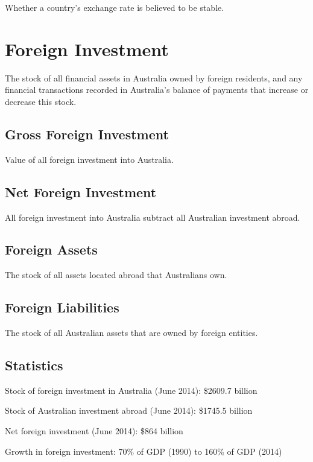 \documentclass[a4paper,11pt]{article}
\begin{document}
Whether a country's exchange rate is believed to be stable.




\section{Foreign Investment}

The stock of all financial assets in Australia owned by foreign residents, and
any financial transactions recorded in Australia's balance of payments that
increase or decrease this stock.


\subsection{Gross Foreign Investment}

Value of all foreign investment into Australia.


\subsection{Net Foreign Investment}

All foreign investment into Australia subtract all Australian investment
abroad.


\subsection{Foreign Assets}

The stock of all assets located abroad that Australians own.


\subsection{Foreign Liabilities}

The stock of all Australian assets that are owned by foreign entities.


\subsection{Statistics}

Stock of foreign investment in Australia (June 2014): \$2609.7 billion

Stock of Australian investment abroad (June 2014): \$1745.5 billion

Net foreign investment (June 2014): \$864 billion

Growth in foreign investment: 70\% of GDP (1990) to 160\% of GDP (2014)
\end{document}
